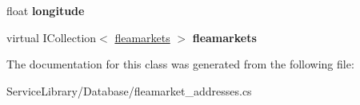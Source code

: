 \begin{DoxyCompactItemize}
\item 
\hypertarget{class_service_library_1_1_database_1_1fleamarket__addresses_a884d58e226129da850fce34c4418dd14}{float {\bfseries longitude}}\label{class_service_library_1_1_database_1_1fleamarket__addresses_a884d58e226129da850fce34c4418dd14}

\item 
\hypertarget{class_service_library_1_1_database_1_1fleamarket__addresses_ade7ccd5ff7d9f6bb4056b23316aea317}{virtual I\-Collection$<$ \hyperlink{class_service_library_1_1_database_1_1fleamarkets}{fleamarkets} $>$ {\bfseries fleamarkets}}\label{class_service_library_1_1_database_1_1fleamarket__addresses_ade7ccd5ff7d9f6bb4056b23316aea317}

\end{DoxyCompactItemize}


The documentation for this class was generated from the following file\-:\begin{DoxyCompactItemize}
\item 
Service\-Library/\-Database/fleamarket\-\_\-addresses.\-cs\end{DoxyCompactItemize}
